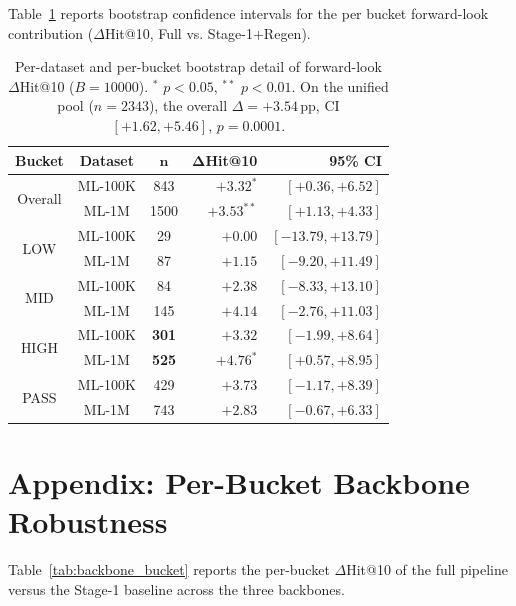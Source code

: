 \documentclass[11pt]{article}
\begin{document}
Table~\ref{tab:fwd_bucket} reports bootstrap confidence intervals for the per bucket forward-look contribution ($\Delta$Hit@10, Full vs. Stage-1+Regen).

\begin{table}[h]
\centering
\small
\setlength{\tabcolsep}{3pt}
\begin{tabular}{cccrr}
\toprule
\textbf{Bucket} & \textbf{Dataset} & $\mathbf{n}$ & $\mathbf{\Delta}$Hit@10 & \textbf{95\% CI} \\
\midrule
\multirow{2}{*}{Overall}
  & ML-100K & 843  & $+3.32^{*}$  & $[+0.36,+6.52]$ \\
  & ML-1M   & 1500 & $+3.53^{**}$ & $[+1.13,+4.33]$ \\
\midrule
\multirow{2}{*}{LOW}
  & ML-100K &  29  & $+0.00$  & $[-13.79,+13.79]$ \\
  & ML-1M   &  87  & $+1.15$  & $[ -9.20,+11.49]$ \\
\multirow{2}{*}{MID}
  & ML-100K &  84  & $+2.38$  & $[ -8.33,+13.10]$ \\
  & ML-1M   & 145  & $+4.14$  & $[ -2.76,+11.03]$ \\
\multirow{2}{*}{HIGH}
  & ML-100K & \textbf{301}  & $\mathbf{+3.32}$  & $\mathbf{[ -1.99, +8.64]}$ \\
  & ML-1M   & \textbf{525}  & $\mathbf{+4.76^{*}}$  & $\mathbf{[+0.57, +8.95]}$ \\
\multirow{2}{*}{PASS}
  & ML-100K & 429  & $+3.73$  & $[ -1.17, +8.39]$ \\
  & ML-1M   & 743  & $+2.83$  & $[ -0.67, +6.33]$ \\
\bottomrule
\end{tabular}
\caption{Per-dataset and per-bucket bootstrap detail of
forward-look $\Delta$Hit@10 ($B{=}10000$). $^{*}$
$p<0.05$, $^{**}$ $p<0.01$. {On the unified pool ($n{=}2343$), the
overall $\Delta = +3.54$\,pp, CI $[+1.62, +5.46]$,
$p=0.0001$.}}
\label{tab:fwd_bucket}
\end{table}

\section{Appendix: Per-Bucket Backbone Robustness}
\label{app:backbone_bucket}
Table~\ref{tab:backbone_bucket} reports the per-bucket 
$\Delta$Hit@10 of the full pipeline versus the Stage-1 
baseline across the three backbones.
\end{document}
